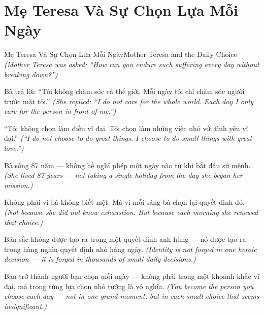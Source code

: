\section{Mẹ Teresa Và Sự Chọn Lựa Mỗi Ngày}
\begin{truyen}{Mẹ Teresa Và Sự Chọn Lựa Mỗi Ngày}{Mother Teresa and the Daily Choice}
\textit{(Mother Teresa was asked: ``How can you endure such suffering every day without breaking down?'')}

Bà trả lời: ``Tôi không chăm sóc cả thế giới. Mỗi ngày tôi chỉ chăm sóc người trước mặt tôi.''
\textit{(She replied: ``I do not care for the whole world. Each day I only care for the person in front of me.'')}

``Tôi không chọn làm điều vĩ đại. Tôi chọn làm những việc nhỏ với tình yêu vĩ đại.''
\textit{(``I do not choose to do great things. I choose to do small things with great love.'')}

Bà sống 87 năm — không hề nghỉ phép một ngày nào từ khi bắt đầu sứ mệnh.
\textit{(She lived 87 years — not taking a single holiday from the day she began her mission.)}

Không phải vì bà không biết mệt. Mà vì mỗi sáng bà chọn lại quyết định đó.
\textit{(Not because she did not know exhaustion. But because each morning she renewed that choice.)}

Bản sắc không được tạo ra trong một quyết định anh hùng — nó được tạo ra trong hàng nghìn quyết định nhỏ hàng ngày.
\textit{(Identity is not forged in one heroic decision — it is forged in thousands of small daily decisions.)}

\end{truyen}

\begin{baihoc}
Bạn trở thành người bạn chọn mỗi ngày — không phải trong một khoảnh khắc vĩ đại, mà trong từng lựa chọn nhỏ tưởng là vô nghĩa.
\textit{(You become the person you choose each day — not in one grand moment, but in each small choice that seems insignificant.)}
\end{baihoc}
